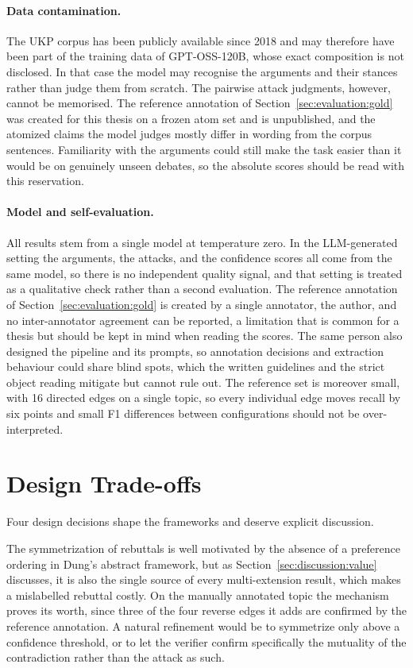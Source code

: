 \paragraph{Data contamination.} The UKP corpus has been publicly available
since 2018 and may therefore have been part of the training data of
GPT-OSS-120B, whose exact composition is not disclosed. In that case the model
may recognise the arguments and their stances rather than judge them from
scratch. The pairwise attack judgments, however, cannot be memorised. The reference
annotation of Section~\ref{sec:evaluation:gold} was created for this thesis on
a frozen atom set and is unpublished, and the atomized claims the model
judges mostly differ in wording from the corpus sentences. Familiarity with the
arguments could still make the task easier than it would be on genuinely
unseen debates, so the absolute scores should be read with this reservation.

\paragraph{Model and self-evaluation.} All results stem from a single model at
temperature zero. In the LLM-generated setting the arguments, the attacks, and
the confidence scores all come from the same model, so there is no independent
quality signal, and that setting is treated as a qualitative check rather than
a second evaluation. The reference annotation of Section~\ref{sec:evaluation:gold} is
created by a single annotator, the author, and no inter-annotator agreement
can be reported, a limitation that is common for a thesis but should be kept in
mind when reading the scores. The same person also designed the pipeline and
its prompts, so annotation decisions and extraction behaviour could share blind
spots, which the written guidelines and the strict object reading mitigate but
cannot rule out. The reference set is moreover small, with 16 directed edges on
a single topic, so every individual edge moves recall by six points and small
F1 differences between configurations should not be over-interpreted.

\section{Design Trade-offs}
\label{sec:discussion:tradeoffs}

Four design decisions shape the frameworks and deserve explicit discussion.

The symmetrization of rebuttals is well motivated by the absence of a
preference ordering in Dung's abstract framework, but as
Section~\ref{sec:discussion:value} discusses, it is also the single source of
every multi-extension result, which makes a mislabelled rebuttal costly. On
the manually annotated topic the mechanism proves its worth, since three of the four reverse
edges it adds are confirmed by the reference annotation. A natural refinement would be to symmetrize only
above a confidence threshold, or to let the verifier confirm specifically the
mutuality of the contradiction rather than the attack as such.

